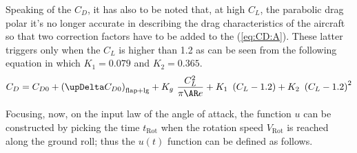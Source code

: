 \bigskip
\noindent
Speaking of the $C_D$, it has also to be noted that, at high $C_L$, the parabolic drag polar it's no longer accurate in describing the drag characteristics of the aircraft so that two correction factors have to be added to the (\ref{eq:CD:A}). These latter triggers only when the $C_L$ is higher than 1.2 as can be seen from the following equation in which $K_1=0.079$ and $K_2=0.365$.
%
\begin{equation}
C_D = C_{D0} + \left(\upDelta C_{D0}\right)_{\text{flap}+\text{lg}} +  K_g\ \frac{C_L^2}{\pi \AR e} + K_1\ \left(C_L-1.2\right) + K_2\ \left(C_L-1.2\right)^2
\end{equation}

\bigskip
\noindent
Focusing, now, on the input law of the angle of attack, the function $u$ can be constructed by picking the time $t_{\text{Rot}}$ when the rotation speed $V_{\text{Rot}}$ is reached along the ground roll; thus the $u (t)$ function can be defined as follows.

